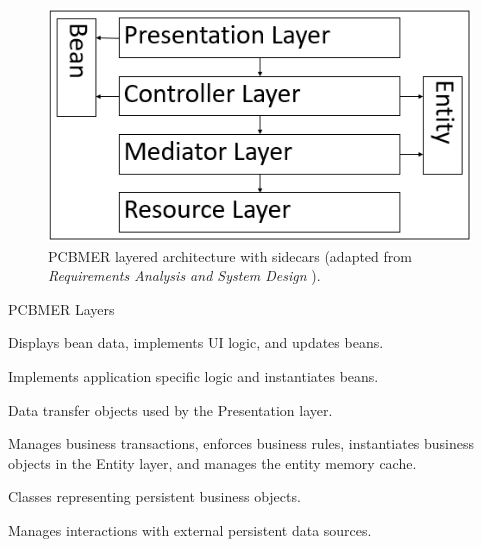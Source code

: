 \documentclass{slide}
\begin{document}
\begin{frame}

\begin{figure}
    \centering
    \includegraphics[width=0.5\paperwidth]{images/pcbmer.png}
    \caption{PCBMER layered architecture with sidecars (adapted from \textit{Requirements Analysis and System Design} \cite{rasd2007}).}
\end{figure}

\end{frame}


\begin{frame}{PCBMER Layers}

\large{
\begin{description}[<+->]
    \setlength\itemsep{0.5em}
    \item[Presentation] Displays bean data, implements UI logic, and updates beans.
    \item[Controller] Implements application specific logic and instantiates beans.
    \item[Bean] Data transfer objects used by the Presentation layer.
    \item[Mediator] Manages business transactions, enforces business rules, instantiates business objects in the Entity layer, and manages the entity memory cache.
    \item[Entity] Classes representing persistent business objects.
    \item[Resource] Manages interactions with external persistent data sources.
\end{description}
}

\end{frame}


\end{document}
